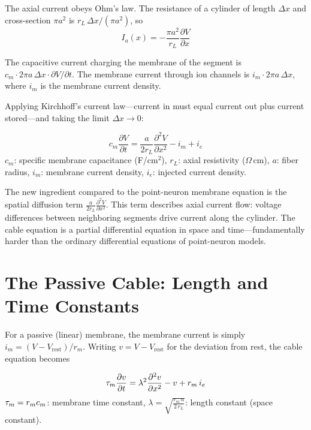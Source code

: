 The axial current obeys Ohm's law. The resistance of a cylinder of length $\Delta x$ and cross-section $\pi a^2$ is $r_L\,\Delta x / (\pi a^2)$, so
%
\begin{equation}
  I_a(x) = -\frac{\pi a^2}{r_L}\frac{\partial V}{\partial x}
  \label{eq:axial-current}
\end{equation}

\noindent The capacitive current charging the membrane of the segment is $c_m \cdot 2\pi a\,\Delta x \cdot \partial V/\partial t$. The membrane current through ion channels is $i_m \cdot 2\pi a\,\Delta x$, where $i_m$ is the membrane current density.

Applying Kirchhoff's current law---current in must equal current out plus current stored---and taking the limit $\Delta x \to 0$:

\begin{keyequation}
\begin{equation}
  c_m\frac{\partial V}{\partial t} = \frac{a}{2r_L}\frac{\partial^2 V}{\partial x^2} - i_m + i_e
  \label{eq:cable}
\end{equation}
\tcblower
$c_m$: specific membrane capacitance (F/cm$^2$), \quad
$r_L$: axial resistivity ($\Omega\,$cm), \quad
$a$: fiber radius, \quad
$i_m$: membrane current density, \quad
$i_e$: injected current density.
\end{keyequation}

\noindent The new ingredient compared to the point-neuron membrane equation is the spatial diffusion term $\frac{a}{2r_L}\frac{\partial^2 V}{\partial x^2}$. This term describes axial current flow: voltage differences between neighboring segments drive current along the cylinder. The cable equation is a partial differential equation in space and time---fundamentally harder than the ordinary differential equations of point-neuron models.

\section{The Passive Cable: Length and Time Constants}
\label{sec:passive-cable}

For a passive (linear) membrane, the membrane current is simply $i_m = (V - V_{\text{rest}})/r_m$. Writing $v = V - V_{\text{rest}}$ for the deviation from rest, the cable equation becomes

\begin{keyequation}
\begin{equation}
  \tau_m\frac{\partial v}{\partial t} = \lambda^2\frac{\partial^2 v}{\partial x^2} - v + r_m\,i_e
  \label{eq:passive-cable}
\end{equation}
\tcblower
$\displaystyle\tau_m = r_m c_m$: membrane time constant, \qquad
$\displaystyle\lambda = \sqrt{\frac{r_m\, a}{2\,r_L}}$: length constant (space constant).
\end{keyequation}

